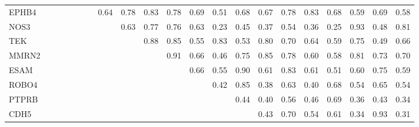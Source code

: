 \begin{longtable}{lrrrrrrrrrrrrrrrrrrrr}
EPHB4    &            &            &             &               &             &             &       0.64 &      0.78 &        0.83 &       0.78 &        0.69 &        0.51 &       0.68 &        0.67 &        0.78 &        0.83 &           0.68 &          0.59 &       0.69 &            0.58 \\
NOS3     &            &            &             &               &             &             &            &      0.63 &        0.77 &       0.76 &        0.63 &        0.23 &       0.45 &        0.37 &        0.54 &        0.36 &           0.25 &          0.93 &       0.48 &            0.81 \\
TEK      &            &            &             &               &             &             &            &           &        0.88 &       0.85 &        0.55 &        0.83 &       0.53 &        0.80 &        0.70 &        0.64 &           0.59 &          0.75 &       0.49 &            0.66 \\
MMRN2    &            &            &             &               &             &             &            &           &             &       0.91 &        0.66 &        0.46 &       0.75 &        0.85 &        0.78 &        0.60 &           0.58 &          0.81 &       0.73 &            0.70 \\
ESAM     &            &            &             &               &             &             &            &           &             &            &        0.66 &        0.55 &       0.90 &        0.61 &        0.83 &        0.61 &           0.51 &          0.60 &       0.75 &            0.59 \\
ROBO4    &            &            &             &               &             &             &            &           &             &            &             &        0.42 &       0.85 &        0.38 &        0.63 &        0.40 &           0.68 &          0.54 &       0.65 &            0.54 \\
PTPRB    &            &            &             &               &             &             &            &           &             &            &             &             &       0.44 &        0.40 &        0.56 &        0.46 &           0.69 &          0.36 &       0.43 &            0.34 \\
CDH5     &            &            &             &               &             &             &            &           &             &            &             &             &            &        0.43 &        0.70 &        0.54 &           0.61 &          0.34 &       0.93 &            0.31 \\

\end{longtable}
